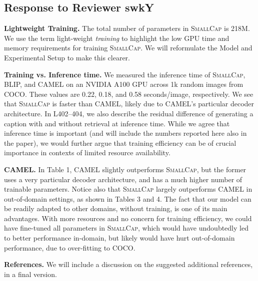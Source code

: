 \documentclass[10pt,twocolumn,letterpaper]{article}
\newcommand{\model}{\textsc{SmallCap}\xspace}
\begin{document}
\subsection{Response to Reviewer swkY}%

\vspace{-0.1cm}

\textbf{Lightweight Training.} The total number of parameters in \model is 218M. We use the term light-weight \textit{training} to highlight the low GPU time and memory requirements for training \model. We will reformulate the Model and Experimental Setup to make this clearer. 

\textbf{Training vs. Inference time.} We measured the inference time of \model, BLIP, and CAMEL on an NVIDIA A100 GPU across 1k random images from COCO. These values are 0.22, 0.18, and 0.58 seconds/image, respectively. We see that \model is faster than CAMEL, likely due to CAMEL's particular decoder architecture. In L402–404, we also describe the residual difference of generating a caption with and without retrieval at inference time. While we agree that inference time is important (and will include the numbers reported here also in the paper), we would further argue that training efficiency can be of crucial importance in contexts of limited resource availability. 

 

\textbf{CAMEL.} In Table 1, CAMEL slightly outperforms \model, but the former uses a very particular decoder architecture, and has a much higher number of trainable parameters. Notice also that \model largely outperforms CAMEL in out-of-domain settings, as shown in Tables 3 and 4. The fact that our model can be readily adapted to other domains, without training, is one of its main advantages. With more resources and no concern for training efficiency, we could have fine-tuned all parameters in \model, which would have undoubtedly led to better performance in-domain, but likely would have hurt out-of-domain performance, due to over-fitting to COCO. 

\textbf{References.} We will include a discussion on the suggested additional references, in a final version.




\end{document}
